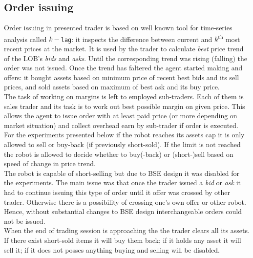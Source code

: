 \documentclass{llncs}
\newcommand{\ts}{\textsuperscript}
\begin{document}
\subsection{Order issuing}
Order issuing in presented trader is based on well known tool for time-series analysis called $k-$\texttt{lag}: it inspects the difference between current and $k$\ts{th} most recent prices at the market. It is used by the trader to calculate \emph{best} price trend of the LOB's \emph{bids} and \emph{asks}. Until the corresponding trend was rising (falling) the order was not issued. Once the trend has faltered the agent started making and offers: it bought assets based on minimum price of recent best bids and its sell prices, and sold assets based on maximum of best ask and its buy price.\\

The task of working on margins is left to employed sub-traders. Each of them is sales trader and its task is to work out best possible margin on given price. This allows the agent to issue order with at least paid price (or more depending on market situation) and collect overhead earn by sub-trader if order is executed.\\
For the experiments presented below if the robot reaches its assets cap it is only allowed to sell or buy-back (if previously short-sold). If the limit is not reached the robot is allowed to decide whether to buy(-back) or (short-)sell based on speed of change in price trend.\\

The robot is capable of short-selling but due to BSE design it was disabled for the experiments. The main issue was that once the trader issued a \emph{bid} or \emph{ask} it had to continue issuing this type of order until it offer was crossed by other trader. Otherwise there is a possibility of crossing one's own offer or other robot. Hence, without substantial changes to BSE design interchangeable orders could not be issued.\\

When the end of trading session is approaching the the trader clears all its assets. If there exist short-sold items it will buy them back; if it holds any asset it will sell it; if it does not posses anything buying and selling will be disabled.
\end{document}
